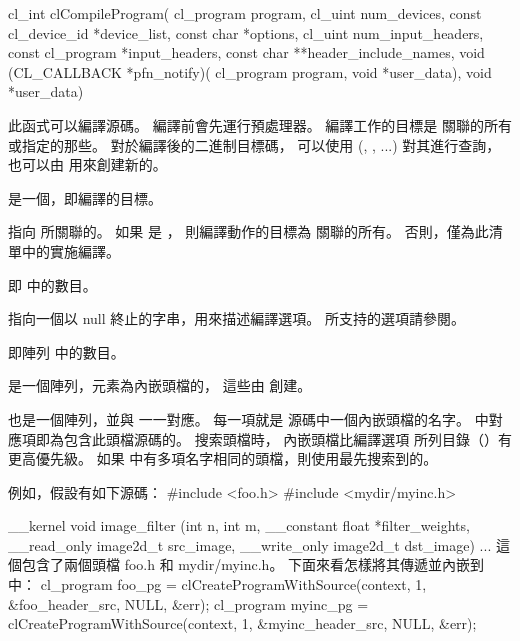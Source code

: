 
\startCLFUNC
cl_int clCompileProgram(
		cl_program program,
		cl_uint num_devices,
		const cl_device_id *device_list,
		const char *options,
		cl_uint num_input_headers,
		const cl_program *input_headers,
		const char **header_include_names,
		void (CL_CALLBACK *pfn_notify)(
				cl_program program,
				void *user_data),
		void *user_data)
\stopCLFUNC

此函式可以編譯源碼。
編譯前會先運行預處理器。
編譯工作的目標是
 關聯的所有或指定的那些。
對於編譯後的二進制目標碼，
可以使用 (, , ...) 對其進行查詢，
也可以由  用來創建新的。

 是一個，即編譯的目標。

 指向  所關聯的。
如果  是 ，
則編譯動作的目標為  關聯的所有。
否則，僅為此清單中的實施編譯。

 即  中的數目。

 指向一個以 null 終止的字串，用來描述編譯選項。
所支持的選項請參閱。

 即陣列  中的數目。

 是一個陣列，元素為內嵌頭檔的，
這些由  創建。

 也是一個陣列，並與  一一對應。
每一項就是  源碼中一個內嵌頭檔的名字。
 中對應項即為包含此頭檔源碼的。
搜索頭檔時，
內嵌頭檔比編譯選項  所列目錄（）有更高優先級。
如果  中有多項名字相同的頭檔，則使用最先搜索到的。

例如，假設有如下源碼：
\startclc[indentnext=no]
#include <foo.h>
#include <mydir/myinc.h>

__kernel void image_filter (int n, int m,
			__constant float *filter_weights,
			__read_only image2d_t src_image,
			__write_only image2d_t dst_image)
{
	...
}
\stopclc
這個包含了兩個頭檔 foo.h 和 mydir/myinc.h。
下面來看怎樣將其傳遞並內嵌到中：
\startclc
cl_program foo_pg = clCreateProgramWithSource(context,
				1, &foo_header_src, NULL, &err);
cl_program myinc_pg = clCreateProgramWithSource(context,
				1, &myinc_header_src, NULL, &err);

